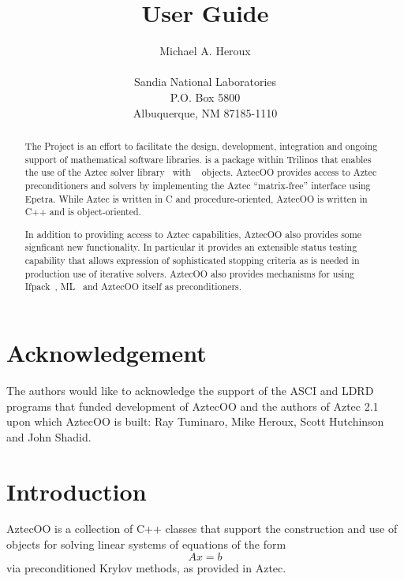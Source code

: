 \documentclass[12pt,relax]{AztecOOUserGuide}
\title{\AztecOOTM{} User Guide}
\author{Michael A. Heroux \\
	\\
	    Sandia National Laboratories\\
	    P.O. Box 5800\\
	    Albuquerque, NM 87185-1110 
	 }
\date{} %
\begin{document}
\maketitle

\begin{abstract}

The \TrilinosTM{} Project is an effort to facilitate the design, development,
integration and ongoing support of mathematical software libraries.
\AztecOOTM{} is a package within Trilinos that enables the use of the Aztec solver 
library~\cite{Aztec2.1} with \EpetraTM{}~\cite{Epetra-Users-Guide} objects.  
AztecOO provides access to Aztec preconditioners and solvers by
implementing the Aztec ``matrix-free'' interface using Epetra.
While Aztec is written in C and procedure-oriented, 
AztecOO is written in C++ and is object-oriented.

In addition to providing access to Aztec capabilities, AztecOO also
provides some signficant new functionality.  In particular it provides
an extensible status testing capability that allows expression of
sophisticated stopping criteria as is needed in production use of
iterative solvers.  AztecOO also provides mechanisms for using 
Ifpack~\cite{Ifpack-home-page}, ML~\cite{ML-home-page} and AztecOO
itself as preconditioners.
\end{abstract}


\section*{Acknowledgement}
The authors would like to acknowledge the support of the ASCI and LDRD 
programs that funded development of AztecOO and the authors of Aztec
2.1 upon which AztecOO is built: Ray Tuminaro, Mike Heroux, Scott
Hutchinson and John Shadid.  

\clearpage
\tableofcontents
\listoffigures

\clearpage

\section{Introduction}
\label{Section:Introduction}

AztecOO is a collection of C++ classes that support the construction
and use of objects for solving linear systems of equations of the form
\begin{equation}
\label{e:axb}
Ax = b
\end{equation}
via
preconditioned Krylov methods, as provided in Aztec.
\end{document}
